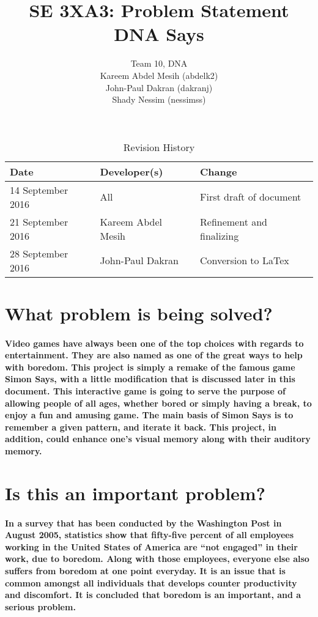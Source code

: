 \documentclass{article}
\title{SE 3XA3: Problem Statement\\DNA Says}
\author{Team 10, DNA
		\\ Kareem Abdel Mesih (abdelk2)
		\\ John-Paul Dakran (dakranj)
		\\ Shady Nessim (nessimss)
}
\date{}
\begin{document}
\begin{table}[hp]
\caption{Revision History} \label{TblRevisionHistory}
\begin{tabularx}{\textwidth}{llX}
\toprule
\textbf{Date} & \textbf{Developer(s)} & \textbf{Change}\\
\midrule
14 September 2016 & All & First draft of document\\
21 September 2016 & Kareem Abdel Mesih & Refinement and finalizing\\
28 September 2016 & John-Paul Dakran & Conversion to LaTex\\
\bottomrule
\end{tabularx}
\end{table}

\newpage

\maketitle

\newpage
\section{What problem is being solved?}

\paragraph{Video games have always been one of the top choices with regards to entertainment. They are also named as one of the great ways to help with boredom. This project is simply a remake of the famous game Simon Says, with a little modification that is discussed later in this document. This interactive game is going to serve the purpose of allowing people of all ages, whether bored or simply having a break, to enjoy a fun and amusing game. The main basis of Simon Says is to remember a given pattern, and iterate it back. This project, in addition, could enhance one’s visual memory along with their auditory memory.}

\section{Is this an important problem?}

\paragraph{In a survey that has been conducted by the Washington Post in August 2005, statistics show that fifty-five percent of all employees working in the United States of America are “not engaged” in their work, due to boredom. Along with those employees, everyone else also suffers from boredom at one point everyday. It is an issue that is common amongst all individuals that develops counter productivity and discomfort. It is concluded that boredom is an important, and a serious problem.}
\end{document}
